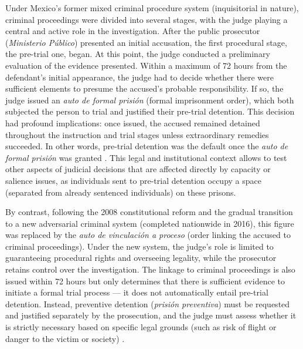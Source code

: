 Under Mexico’s former mixed criminal procedure system (inquisitorial in nature), criminal proceedings were divided into several stages, with the judge playing a central and active role in the investigation. After the public prosecutor (\textit{Ministerio Público}) presented an initial accusation, the first procedural stage, the pre-trial one, began. At this point, the judge conducted a preliminary evaluation of the evidence presented. Within a maximum of 72 hours from the defendant’s initial appearance, the judge had to decide whether there were sufficient elements to presume the accused’s probable responsibility. If so, the judge issued an \textit{auto de formal prisión} (formal imprisonment order), which both subjected the person to trial and justified their pre-trial detention. This decision had profound implications: once issued, the accused remained detained throughout the instruction and trial stages unless extraordinary remedies succeeded. In other words, pre-trial detention was the default once the \textit{auto de formal prisión} was granted \citep{cossio2015formalprision}. This legal and institutional context allows to test other aspects of judicial decisions that are affected directly by capacity or salience issues, as individuals sent to pre-trial detention occupy a space (separated from already sentenced individuals) on these prisons.

By contrast, following the 2008 constitutional reform and the gradual transition to a new adversarial criminal system (completed nationwide in 2016), this figure was replaced by the \textit{auto de vinculación a proceso} (order linking the accused to criminal proceedings). Under the new system, the judge’s role is limited to guaranteeing procedural rights and overseeing legality, while the prosecutor retains control over the investigation. The linkage to criminal proceedings is also issued within 72 hours but only determines that there is sufficient evidence to initiate a formal trial process — it does not automatically entail pre-trial detention. Instead, preventive detention (\textit{prisión preventiva}) must be requested and justified separately by the prosecution, and the judge must assess whether it is strictly necessary based on specific legal grounds (such as risk of flight or danger to the victim or society) \citep{cossio2015formalprision}.

